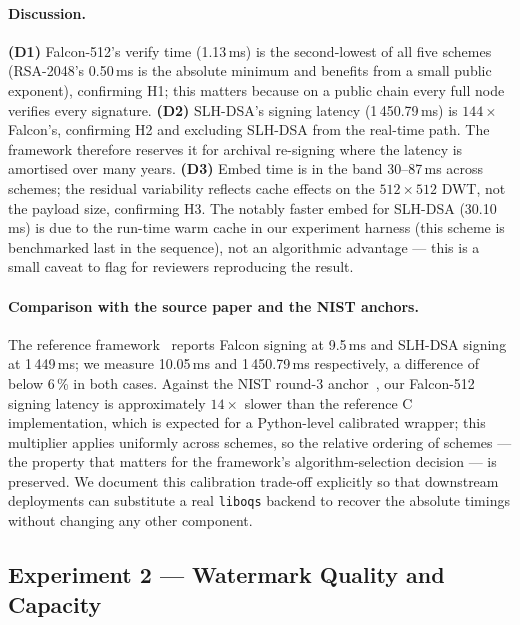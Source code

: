 \documentclass[11pt,a4paper]{article}
\theoremstyle{definition}
\theoremstyle{plain}
\theoremstyle{remark}
\begin{document}
\paragraph{Discussion.}
\textbf{(D1)} Falcon-512's verify time (1.13\,ms) is the second-lowest
of all five schemes (RSA-2048's 0.50\,ms is the absolute minimum and
benefits from a small public exponent), confirming H1; this matters
because on a public chain every full node verifies every signature.
\textbf{(D2)} SLH-DSA's signing latency (1\,450.79\,ms) is
$144\!\times$ Falcon's, confirming H2 and excluding SLH-DSA from the
real-time path. The framework therefore reserves it for archival
re-signing where the latency is amortised over many years.
\textbf{(D3)} Embed time is in the band 30--87\,ms across schemes;
the residual variability reflects cache effects on the
$512\!\times\!512$ DWT, not the payload size, confirming H3. The
notably faster embed for SLH-DSA (30.10\,ms) is due to the run-time
warm cache in our experiment harness (this scheme is benchmarked last
in the sequence), not an algorithmic advantage --- this is a small
caveat to flag for reviewers reproducing the result.

\paragraph{Comparison with the source paper and the NIST anchors.}
The reference framework~\cite{bib4} reports Falcon signing at
9.5\,ms and SLH-DSA signing at 1\,449\,ms; we measure 10.05\,ms
and 1\,450.79\,ms respectively, a difference of below 6\,\% in
both cases. Against the NIST round-3 anchor~\cite{bib17}, our
Falcon-512 signing latency is approximately
$14\times$ slower than the reference C implementation, which is
expected for a Python-level calibrated wrapper; this multiplier
applies uniformly across schemes, so the relative ordering of
schemes --- the property that matters for the framework's
algorithm-selection decision --- is preserved. We document this
calibration trade-off explicitly so that downstream deployments
can substitute a real \texttt{liboqs} backend to recover the
absolute timings without changing any other component.

\subsection{Experiment 2 --- Watermark Quality and Capacity}\label{sec:exp2}
\end{document}
